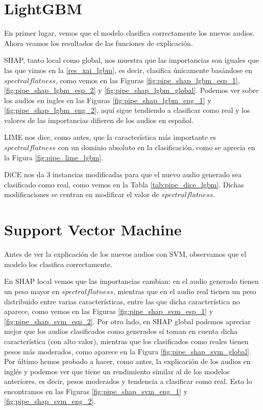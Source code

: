 \section{LightGBM}

En primer lugar, vemos que el modelo clasifica correctamente los nuevos audios. Ahora veamos los resultados de las funciones de explicación. 

SHAP, tanto local como global, nos muestra que las importancias son iguales que las que vimos en la \autoref{res_xai_lgbm}, es decir, clasifica únicamente basándose en $spectral flatness$, como vemos en las Figuras \ref{fig:pipe_shap_lgbm_esp_1}, \ref{fig:pipe_shap_lgbm_esp_2} y \ref{fig:pipe_shap_lgbm_global}. Podemos ver sobre los audios en ingles en las Figuras \ref{fig:pipe_shap_lgbm_eng_1} y \ref{fig:pipe_shap_lgbm_eng_2}, aquí sigue tendiendo a clasificar como real y los valores de las importancias difieren de los audios en español.

LIME nos dice, como antes, que la característica más importante es $spectral flatness$ con un dominio absoluto en la clasificación, como se aprecia en la Figura \ref{fig:pipe_lime_lgbm}.

DiCE nos da 3 instancias modificadas para que el nuevo audio generado sea clasificado como real, como vemos en la Tabla \ref{tab:pipe_dice_lgbm}. Dichas modificaciones se centran en modificar el valor de $spectral flatness$.

\section{Support Vector Machine}

Antes de ver la explicación de los nuevos audios con SVM, observamos que el modelo los clasifica correctamente.

En SHAP local vemos que las importancias cambian: en el audio generado tienen un peso mayor en $spectral flatness$, mientras que en el audio real tienen un peso distribuido entre varias características, entre las que dicha característica no aparece, como vemos en las Figuras \ref{fig:pipe_shap_svm_esp_1} y \ref{fig:pipe_shap_svm_esp_2}. Por otro lado, en SHAP global podemos apreciar mejor que los audios clasificados como generados sí toman en cuenta dicha característica (con alto valor), mientras que los clasificados como reales tienen pesos más moderados, como aparece en la Figura \ref{fig:pipe_shap_svm_global}. Por último hemos probado a hacer, como antes, la explicación de los audios en inglés y podemos ver que tiene un rendimiento similar al de los modelos anteriores, es decir, pesos moderados y tendencia a clasificar como real. Esto lo encontramos en las Figuras \ref{fig:pipe_shap_svm_eng_1} y \ref{fig:pipe_shap_svm_eng_2}.

